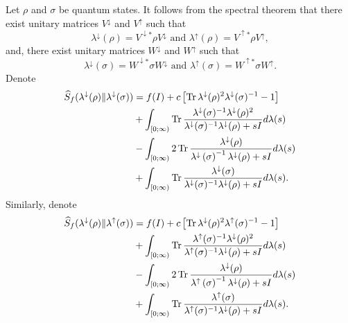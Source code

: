\documentclass[10pt,reqno]{amsart}
\theoremstyle{break-italic}
\theoremstyle{break-italic}
\theoremstyle{break-italic}
\theoremstyle{break-italic}
\theoremstyle{break-italic}
\theoremstyle{break-italic}
\theoremstyle{break-italic}
\theoremstyle{break-italic}
\theoremstyle{break-roman}
\theoremstyle{standard}
\theoremstyle{varthm-roman}
\theoremstyle{varthm-italic}
\theoremstyle{varthm-roman-break}
\theoremstyle{varthm-italic-break}
\theoremstyle{varthm-roman-no-punctuation}
\theoremstyle{varthm-italic-no-punctuation}
\numberwithin{equation}{section}
\begin{document}
Let $\rho$ and $\sigma$ be quantum states. It follows from the spectral theorem that there exist unitary matrices $V^\downarrow$ and $V^\uparrow$ such that 
\begin{equation}\label{V-lambda}
\lambda^\downarrow (\rho)= V^{\downarrow *} \rho V^\downarrow \mbox{ and } \lambda^\uparrow (\rho)= V^{\uparrow *} \rho V^\uparrow,
\end{equation}
and, there exist unitary matrices $W^\downarrow$ and $W^\uparrow$ such that 
\begin{equation}\label{W-lambda}
\lambda^\downarrow (\sigma)= W^{\downarrow *} \sigma W^\downarrow \mbox{ and } \lambda^\uparrow (\sigma)= W^{\uparrow *} \sigma W^\uparrow. 
\end{equation}
Denote 
\begin{align}\label{max-divergence-lambdadowndown}
\widehat{S}_f(\lambda^\downarrow(\rho)\|\lambda^\downarrow(\sigma))&=f(I)+c\left[\operatorname{Tr}\lambda^\downarrow(\rho)^2\lambda^\downarrow(\sigma)^{-1}-1\right]\nonumber\\
&+\int_{[0;\infty)}\operatorname{Tr}\dfrac{\lambda^\downarrow(\sigma)^{-1}\lambda^\downarrow(\rho)^{2}}{\lambda^\downarrow(\sigma)^{-1}\lambda^\downarrow(\rho)+s I} d\lambda(s)\nonumber\\
&-\int_{[0;\infty)}\-2\operatorname{Tr}\dfrac{\lambda^\downarrow(\rho)}{\lambda^\downarrow\left(\sigma\right)^{-1}\lambda^\downarrow(\rho)+sI}d\lambda(s)\nonumber\\
&+\int_{[0;\infty)}\operatorname{Tr} \dfrac{\lambda^\downarrow(\sigma)}{\lambda^\downarrow(\sigma)^{-1}\lambda^\downarrow(\rho) + sI}d\lambda(s).
\end{align}
Similarly, denote 
\begin{align}\label{max-divergence-lambdaupdown}
\widehat{S}_f(\lambda^\downarrow(\rho)\|\lambda^\uparrow(\sigma))&=f(I)+c\left[\operatorname{Tr}\lambda^\downarrow(\rho)^2\lambda^\uparrow(\sigma)^{-1}-1\right]\nonumber\\
&+\int_{[0;\infty)}\operatorname{Tr}\dfrac{\lambda^\uparrow(\sigma)^{-1}\lambda^\downarrow(\rho)^{2}}{\lambda^\uparrow(\sigma)^{-1}\lambda^\downarrow(\rho)+s I} d\lambda(s)\nonumber\\
&-\int_{[0;\infty)}\-2\operatorname{Tr}\dfrac{\lambda^\downarrow(\rho)}{\lambda^\uparrow\left(\sigma\right)^{-1}\lambda^\downarrow(\rho)+sI}d\lambda(s)\nonumber\\
&+\int_{[0;\infty)}\operatorname{Tr} \dfrac{\lambda^\uparrow(\sigma)}{\lambda^\uparrow(\sigma)^{-1}\lambda^\downarrow(\rho) + sI}d\lambda(s).
\end{align}
\end{document}
